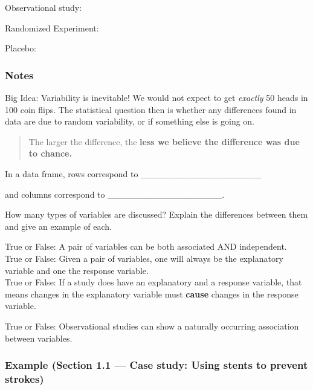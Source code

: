 \documentclass[
]{report}
\newcommand{\rgs}{\vspace{12pt}} %
\begin{document}
Observational study:
\rgs

Randomized Experiment:
\rgs

Placebo:
\rgs

\newpage

\hypertarget{notes}{%
\subsubsection*{Notes}\label{notes}}

Big Idea: Variability is inevitable! We would not expect to get \emph{exactly} 50 heads in 100 coin flips. The statistical question then is whether any differences found in data are due to random variability, or if something else is going on.

\begin{quote}
The larger the difference, the \textbf{less we believe the difference was due to chance.}
\end{quote}

In a data frame, rows correspond to \_\_\_\_\_\_\_\_\_\_\_\_\_\_\_\_\_\_\_

and columns correspond to \_\_\_\_\_\_\_\_\_\_\_\_\_\_\_\_\_\_.

How many types of variables are discussed? Explain the differences between them and give an example of each.
\rgs
\rgs

True or False: A pair of variables can be both associated AND independent.\\
True or False: Given a pair of variables, one will always be the explanatory variable and one the response variable.\\
True or False: If a study does have an explanatory and a response variable, that means changes in the explanatory variable must \textbf{cause} changes in the response variable.

True or False: Observational studies can show a naturally occurring association between variables.

\hypertarget{example-section-1.1-case-study-using-stents-to-prevent-strokes}{%
\subsubsection*{Example (Section 1.1 --- Case study: Using stents to prevent strokes)}\label{example-section-1.1-case-study-using-stents-to-prevent-strokes}}
\end{document}
